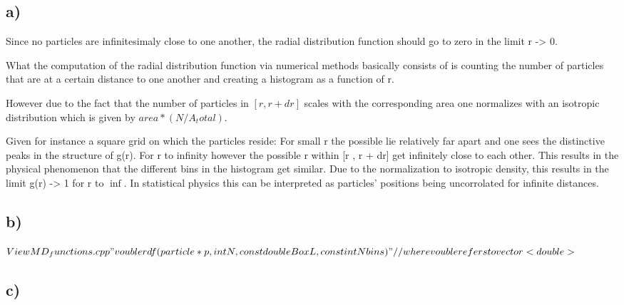 \documentclass[12pt,a4paper]{article}	%
\begin{document}
\subsection{a)}

        Since no particles are infinitesimaly close to one another, the radial distribution function should go to zero in the limit r -> 0.

        What the computation of the radial distribution function via numerical methods basically consists of is counting the number of particles
        that are at a certain distance to one another and creating a histogram as a function of r. 

        However due to the fact that the number of particles in $[r , r + dr]$ scales with the corresponding area one normalizes with an isotropic 
        distribution which is given by $area*(N/A_total)$.

        Given for instance a square grid on which the particles reside:
        For small r the possible lie relatively far apart and one sees the distinctive peaks in the structure of g(r).
        For r to infinity however the possible r within [r , r + dr] get infinitely close to each other. This results in the physical phenomenon 
        that the different bins in the histogram get similar. Due to the normalization to isotropic density, this results in the limit g(r) -> 1
        for r to $\inf$. 
        In statistical physics this can be interpreted as particles' positions being uncorrolated for infinite distances. 

\subsection{b)} 
$        View MD_functions.cpp "vouble rdf(particle* p, int N, const double BoxL, const int Nbins)" //where vouble refers to vector<double>$

\subsection{c)} 
\end{document}
